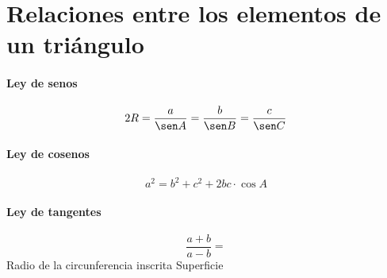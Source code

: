 \documentclass[12pt, a5paper]{article}
\begin{document}
	
	\section*{Relaciones entre los elementos de un triángulo}
	\begin{tikzpicture}
		
	\end{tikzpicture}
	
	\paragraph{Ley de senos}
	$$
	2R = \dfrac{a}{\sen A} = \dfrac{b}{\sen B} = \dfrac{c}{\sen C}
	$$
	
	\paragraph{Ley de cosenos}
	$$
	a^{2} = b^{2} + c^{2} + 2bc \cdot \cos A
	$$
	
	\paragraph{Ley de tangentes}
	$$
	\dfrac{a + b}{a - b} = 
	$$
	Radio de la circunferencia inscrita
	Superficie
	
	
\end{document}
